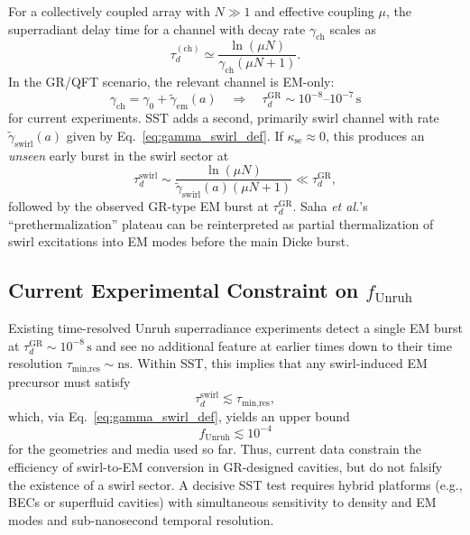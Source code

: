     For a collectively coupled array with $N\gg 1$ and effective coupling
    $\mu$, the superradiant delay time for a channel with decay rate
    $\gamma_{\text{ch}}$ scales as \cite{GrossHaroche1982,Deswal2025}
    \begin{equation}
        \tau_d^{(\text{ch})}
        \simeq \frac{\ln(\mu N)}{\gamma_{\text{ch}}(\mu N + 1)}.
    \end{equation}
    In the GR/QFT scenario, the relevant channel is EM-only:
    \begin{equation}
        \gamma_{\text{ch}} = \gamma_0 + \tilde\gamma_{\text{em}}(a)
        \quad\Rightarrow\quad
        \tau_d^{\text{GR}} \sim 10^{-8}\text{--}10^{-7}\,\mathrm{s}
    \end{equation}
    for current experiments. SST adds a second, primarily swirl channel with
    rate $\tilde\gamma_{\text{swirl}}(a)$ given by
    Eq.~\eqref{eq:gamma_swirl_def}. If $\kappa_{\text{se}}\approx 0$, this
    produces an \emph{unseen} early burst in the swirl sector at
    \begin{equation}
        \tau_d^{\text{swirl}}
        \sim \frac{\ln(\mu N)}{\tilde\gamma_{\text{swirl}}(a)(\mu N + 1)}
        \ll \tau_d^{\text{GR}},
    \end{equation}
    followed by the observed GR-type EM burst at $\tau_d^{\text{GR}}$.
    Saha \emph{et al.}'s ``prethermalization'' plateau \cite{Saha2025} can be
    reinterpreted as partial thermalization of swirl excitations into EM modes
    before the main Dicke burst.

\subsection{Current Experimental Constraint on $f_{\text{Unruh}}$}

    Existing time-resolved Unruh superradiance experiments
    \cite{Lochan2020,WangBlencowe2021,Deswal2025,Zheng2025,Saha2025} detect a
    single EM burst at $\tau_d^{\text{GR}}\sim10^{-8}\,\mathrm{s}$ and see no
    additional feature at earlier times down to their time resolution
    $\tau_{\text{min,res}}\sim \mathrm{ns}$. Within SST, this implies that any
    swirl-induced EM precursor must satisfy
    \begin{equation}
        \tau_d^{\text{swirl}} \lesssim \tau_{\text{min,res}},
    \end{equation}
    which, via Eq.~\eqref{eq:gamma_swirl_def}, yields an upper bound
    \begin{equation}
        f_{\text{Unruh}} \lesssim 10^{-4}
    \end{equation}
    for the geometries and media used so far. Thus, current data constrain the
    efficiency of swirl-to-EM conversion in GR-designed cavities, but do not
    falsify the existence of a swirl sector. A decisive SST test requires
    hybrid platforms (e.g., BECs or superfluid cavities) with simultaneous
    sensitivity to density and EM modes \cite{Steinhauer2016,Gooding2020} and
    sub-nanosecond temporal resolution.

